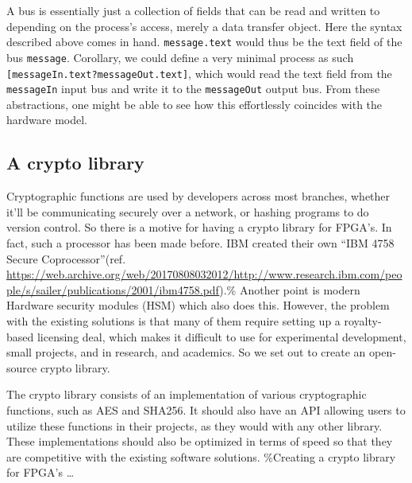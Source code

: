 \documentclass[11pt]{article}
\begin{document}
A bus is essentially just a collection of fields that can be read and written to depending on the process's access, merely a data transfer object. Here the syntax described above comes in hand. \texttt{message.text} would thus be the text field of the bus \texttt{message}. Corollary, we could define a very minimal process as such \texttt{[messageIn.text?messageOut.text]}, which would read the text field from the \texttt{messageIn} input bus and write it to the \texttt{messageOut} output bus. From these abstractions, one might be able to see how this effortlessly coincides with the hardware model.
\subsection{A crypto library}
\label{sec:org1e850f0}
Cryptographic functions are used by developers across most branches, whether it'll be communicating securely over a network, or hashing programs to do version control.
So there is a motive for having a crypto library for FPGA's. In fact, such a processor has been made before. IBM created their own ``IBM 4758 Secure Coprocessor''(ref. \url{https://web.archive.org/web/20170808032012/http://www.research.ibm.com/people/s/sailer/publications/2001/ibm4758.pdf}).\% Another point is modern Hardware security modules (HSM) which also does this.
However, the problem with the existing solutions is that many of them require setting up a royalty-based licensing deal, which makes it difficult to use for experimental development, small projects, and in research, and academics.
So we set out to create an open-source crypto library.

The crypto library consists of an implementation of various cryptographic functions, such as AES and SHA256. It should also have an API allowing users to utilize these functions in their projects, as they would with any other library.
These implementations should also be optimized in terms of speed so that they are competitive with the existing software solutions.
\%Creating a crypto library for FPGA's \ldots{}
\end{document}
